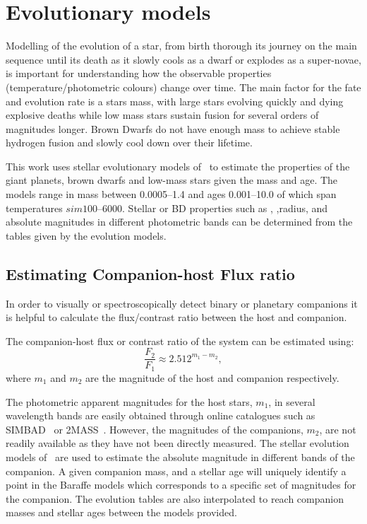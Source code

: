 
\section{Evolutionary models}
\label{sec:evolutionary_models}
Modelling of the evolution of a star, from birth thorough its journey on the main sequence until its death as it slowly cools as a dwarf or explodes as a super-novae, is important for understanding how the observable properties  (temperature/photometric colours) change over time.
The main factor for the fate and evolution rate is a stars mass, with large stars evolving quickly and dying explosive deaths while low mass stars sustain fusion for several orders of magnitudes longer.
Brown Dwarfs do not have enough mass to achieve stable hydrogen fusion and slowly cool down over their lifetime.

This work uses stellar evolutionary models of~\citet{baraffe_evolutionary_2003, baraffe_new_2015} to estimate the properties of the giant planets, brown dwarfs and low-mass stars given the mass and age.
The models range in mass between 0.0005--1.4\Msun{} and ages 0.001--10.0\Gyr{} of which span temperatures $sim100$--6000\K{}.
Stellar or {BD} properties such as \Teff{}, \Logg{},radius, and absolute magnitudes in different photometric bands can be determined from the tables given by the evolution models.

\subsection{Estimating Companion-host Flux ratio}
\label{subsec:compaion_flux_ratio}
In order to visually or spectroscopically detect binary or planetary companions it is helpful to calculate the flux/contrast ratio between the host and companion.

The companion-host flux or contrast ratio of the system can be estimated using:
\begin{equation}
\frac{F_{2}}{F_{1}} \approx 2.512^{m_{1} - m_{2}}, \label{eqn:mag_flux_ratios}
\end{equation}
where \(m_{1}\) and \(m_{2}\) are the magnitude of the host and companion respectively.

The photometric apparent magnitudes for the host stars, \(m_{1}\), in several wavelength bands are easily obtained through online catalogues such as {SIMBAD}~\citep{wenger_simbad_2000} or {2MASS}~\citep{skrutskie_two_2006}.
However, the magnitudes of the companions, \(m_{2}\), are not readily available as they have not been directly measured.
The stellar evolution models of~\citet{baraffe_evolutionary_2003, baraffe_new_2015} are used to estimate the absolute magnitude in different bands of the companion.
A given companion mass, and a stellar age will uniquely identify a point in the Baraffe models which corresponds to a specific set of magnitudes for the companion.
The evolution tables are also interpolated to reach companion masses and stellar ages between the models provided.

